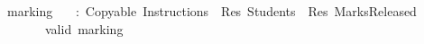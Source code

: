 \ marking{\isacharcolon}\isanewline
\ \ \ :\ Copyable\ Instructions\ \isasymodot\ Res\ Students\ \isasymrightarrow\ Res\ MarksReleased\isanewline
\ \ \ \ \ \ \ valid\ marking\isanewline
\ \ \ 
